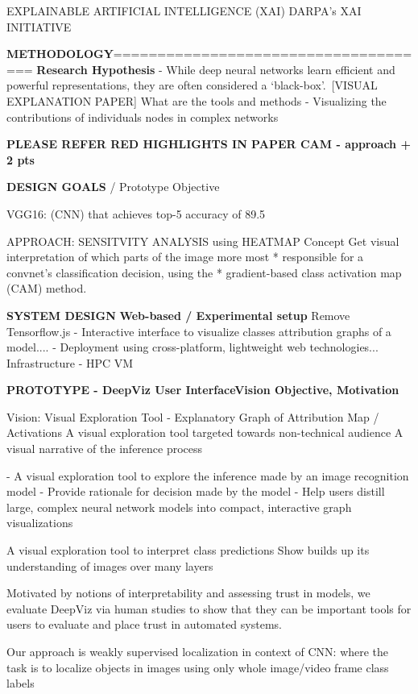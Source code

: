 EXPLAINABLE ARTIFICIAL INTELLIGENCE (XAI)
DARPA's XAI INITIATIVE

\textbf{METHODOLOGY}=====================================
\textbf{Research Hypothesis}
- While deep neural networks learn efficient and powerful representations, they are often considered a ‘black-box’. [VISUAL EXPLANATION PAPER] What are the tools and methods 
- Visualizing the contributions of individuals nodes in complex networks

\textbf{PLEASE REFER RED HIGHLIGHTS IN PAPER CAM - approach + 2 pts}

\textbf{DESIGN GOALS} / Prototype Objective

VGG16: (CNN) that achieves top-5 accuracy of 89.5%

APPROACH: SENSITVITY ANALYSIS using HEATMAP Concept
Get visual interpretation of which parts of the image more most
 *    responsible for a convnet's classification decision, using the
 *    gradient-based class activation map (CAM) method.
 
 \textbf{SYSTEM DESIGN}
 \textbf{Web-based / Experimental setup}
 Remove Tensorflow.js
 - Interactive interface to visualize classes attribution graphs of a model....
 - Deployment using cross-platform, lightweight web technologies...
Infrastructure - HPC VM

 \textbf{PROTOTYPE - DeepViz User InterfaceVision Objective, Motivation}

Vision:  Visual Exploration Tool - Explanatory Graph of Attribution Map / Activations
A visual exploration tool targeted towards non-technical audience
A visual narrative of the inference process

- A visual exploration tool to explore the inference made by an image recognition model
- Provide rationale for decision made by the model
- Help users distill large, complex neural network models into compact, interactive graph visualizations

A visual exploration tool to interpret class predictions
Show builds up its understanding of images over many layers

Motivated by notions of interpretability and assessing trust in models, we evaluate DeepViz via human studies to show that they can be important tools for users to evaluate and place trust in automated systems.

Our approach is weakly supervised localization in context of CNN: where the task is to localize objects in images using only whole image/video frame class labels

